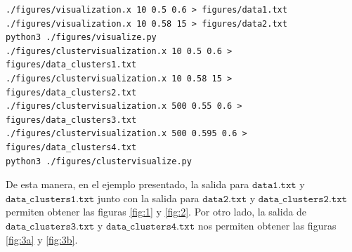 \documentclass[12pt,a4paper]{article}
\begin{document}
\begin{lstlisting}[style=bash-style]
./figures/visualization.x 10 0.5 0.6 > figures/data1.txt
./figures/visualization.x 10 0.58 15 > figures/data2.txt
python3 ./figures/visualize.py
./figures/clustervisualization.x 10 0.5 0.6 > figures/data_clusters1.txt
./figures/clustervisualization.x 10 0.58 15 > figures/data_clusters2.txt 
./figures/clustervisualization.x 500 0.55 0.6 > figures/data_clusters3.txt
./figures/clustervisualization.x 500 0.595 0.6 > figures/data_clusters4.txt
python3 ./figures/clustervisualize.py
\end{lstlisting}

De esta manera, en el ejemplo presentado, la salida para $\texttt{data1.txt}$ y $\texttt{data\_clusters1.txt}$ junto con la salida para $\texttt{data2.txt}$ y $\texttt{data\_clusters2.txt}$ permiten obtener las figuras \ref{fig:1} y \ref{fig:2}. Por otro lado, la salida de $\texttt{data\_clusters3.txt}$ y $\texttt{data\_clusters4.txt}$ nos permiten obtener las figuras \ref{fig:3a} y \ref{fig:3b}.
\end{document}
